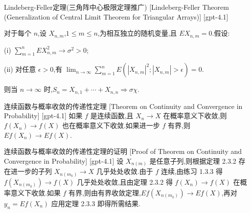 \documentclass[UTF8]{ctexart}
\begin{document}
    
    
    \begin{thm}
        {Lindeberg-Feller定理(三角阵中心极限定理推广)}
        [Lindeberg-Feller Theorem (Generalization of Central Limit Theorem for Triangular Arrays)]
        [gpt-4.1]
        
对于每个 $n$,设 $X_{n,m}$,$1 \leq m \leq n$,为相互独立的随机变量,且 $E X_{n,m} = 0$.假设:

(i) $\sum_{m=1}^{n} E X_{n,m}^2 \to \sigma^2 > 0$;

(ii) 对任意 $\epsilon > 0$,有 $\lim_{n \to \infty} \sum_{m=1}^{n} E(|X_{n,m}|^2; |X_{n,m}| > \epsilon) = 0$.

则当 $n \to \infty$ 时,$S_n = X_{n,1} + \cdots + X_{n,n} \Rightarrow \sigma \chi$.

    \end{thm}
    
    
    
    \begin{thm}
        {连续函数与概率收敛的传递性定理}
        [Theorem on Continuity and Convergence in Probability]
        [gpt-4.1]
        如果 $f$ 是连续函数,且 $X_n \to X$ 在概率意义下收敛,则 $f(X_n) \to f(X)$ 也在概率意义下收敛.如果进一步 $f$ 有界,则 $E f(X_n) \to E f(X)$.
    \end{thm}
    
    
    
    \begin{prf}
        {连续函数与概率收敛的传递性定理的证明}
        [Proof of Theorem on Continuity and Convergence in Probability]
        [gpt-4.1]
        设 $X_{n(m)}$ 是任意子列,则根据定理 2.3.2 存在进一步的子列 $X_{n(m_k)} \to X$ 几乎处处收敛.由于 $f$ 连续,由练习 1.3.3 得 $f(X_{n(m_k)}) \to f(X)$ 几乎处处收敛,且由定理 2.3.2 得 $f(X_n) \to f(X)$ 在概率意义下收敛.如果 $f$ 有界,则由有界收敛定理,$E f(X_{n(m_k)}) \to E f(X)$,再对 $y_n = E f(X_n)$ 应用定理 2.3.3 即得所需结果.
    \end{prf}
    
    
    
\end{document}
